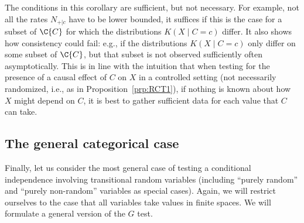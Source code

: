 The conditions in this corollary are sufficient, but not necessary. For example,
not all the rates $N_{+|c}$ have to be lower bounded, it suffices if this is
the case for a subset of $\C{C}$ for which the distributions $K(X \mid C=c)$ differ.
It also shows how consistency could fail: e.g., if the distributions
$K(X \mid C=c)$ only differ on some subset of $\C{C}$, but that subset is not 
observed sufficiently often asymptotically. This is in line with the intuition that
when testing for the presence of a causal effect of $C$ on $X$ in a controlled
setting (not necessarily randomized, i.e., as in Proposition~\ref{prp:RCT1}), if
nothing is known about how $X$ might depend on $C$, it is best to gather sufficient
data for each value that $C$ can take.




\subsection{The general categorical case}

Finally, let us consider the most general case of testing a conditional independence involving transitional
random variables (including ``purely random'' and ``purely non-random'' variables as special cases).
Again, we will restrict ourselves to the case that all variables take values in finite spaces.
We will formulate a general version of the $G$ test.


